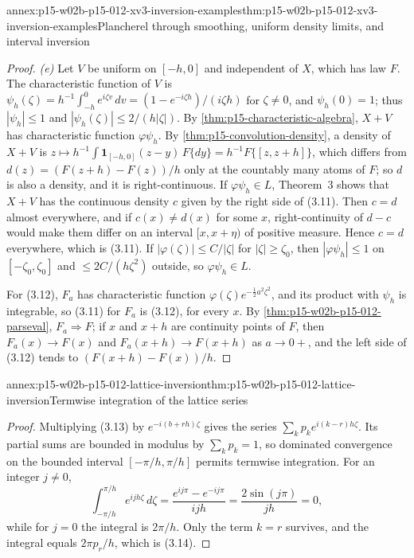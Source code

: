 \begin{annexitem}{annex:p15-w02b-p15-012-xv3-inversion-examples}{thm:p15-w02b-p15-012-xv3-inversion-examples}{Plancherel through smoothing, uniform density limits, and interval inversion}
\begin{proof}
\emph{(e)} Let \(V\) be uniform on \([-h,0]\) and independent of \(X\), which
has law \(F\). The characteristic function of \(V\) is
\(\psi_h(\zeta)=h^{-1}\int_{-h}^0e^{i\zeta v}\,dv=(1-e^{-i\zeta h})/(i\zeta h)\) for
\(\zeta\neq0\), and \(\psi_h(0)=1\); thus \(|\psi_h|\leq1\) and
\(|\psi_h(\zeta)|\leq2/(h|\zeta|)\). By \cref{thm:p15-characteristic-algebra},
\(X+V\) has characteristic function \(\varphi\psi_h\). By
\cref{thm:p15-convolution-density}, a density of \(X+V\) is
\(z\mapsto h^{-1}\int\mathbf 1_{[-h,0]}(z-y)\,F\{dy\}=h^{-1}F\{[z,z+h]\}\), which
differs from \(d(z)=(F(z+h)-F(z))/h\) only at the countably many atoms of
\(F\); so \(d\) is also a density, and it is right-continuous. If
\(\varphi\psi_h\in L\), Theorem~3 shows that \(X+V\) has the continuous density
\(c\) given by the right side of (3.11). Then \(c=d\) almost everywhere, and if
\(c(x)\neq d(x)\) for some \(x\), right-continuity of \(d-c\) would make them
differ on an interval \([x,x+\eta)\) of positive measure. Hence \(c=d\)
everywhere, which is (3.11). If \(|\varphi(\zeta)|\leq C/|\zeta|\) for
\(|\zeta|\geq\zeta_0\), then \(|\varphi\psi_h|\leq1\) on
\([-\zeta_0,\zeta_0]\) and \(\leq2C/(h\zeta^2)\) outside, so
\(\varphi\psi_h\in L\).

For (3.12), \(F_a\) has characteristic function
\(\varphi(\zeta)e^{-\frac12a^2\zeta^2}\), and its product with \(\psi_h\) is
integrable, so (3.11) for \(F_a\) is (3.12), for every \(x\). By
\cref{thm:p15-w02b-p15-012-parseval}, \(F_a\Rightarrow F\); if \(x\) and \(x+h\)
are continuity points of \(F\), then \(F_a(x)\to F(x)\) and
\(F_a(x+h)\to F(x+h)\) as \(a\to0+\), and the left side of (3.12) tends to
\((F(x+h)-F(x))/h\).
\end{proof}
\end{annexitem}

\begin{annexitem}{annex:p15-w02b-p15-012-lattice-inversion}{thm:p15-w02b-p15-012-lattice-inversion}{Termwise integration of the lattice series}
\begin{proof}
Multiplying (3.13) by \(e^{-i(b+rh)\zeta}\) gives the series
\(\sum_kp_ke^{i(k-r)h\zeta}\). Its partial sums are bounded in modulus by
\(\sum_kp_k=1\), so dominated convergence on the bounded interval
\([-\pi/h,\pi/h]\) permits termwise integration. For an integer \(j\neq0\),
\[
 \int_{-\pi/h}^{\pi/h}e^{ijh\zeta}\,d\zeta=\frac{e^{ij\pi}-e^{-ij\pi}}{ijh}
   =\frac{2\sin(j\pi)}{jh}=0,
\]
while for \(j=0\) the integral is \(2\pi/h\). Only the term \(k=r\) survives,
and the integral equals \(2\pi p_r/h\), which is (3.14).
\end{proof}
\end{annexitem}

